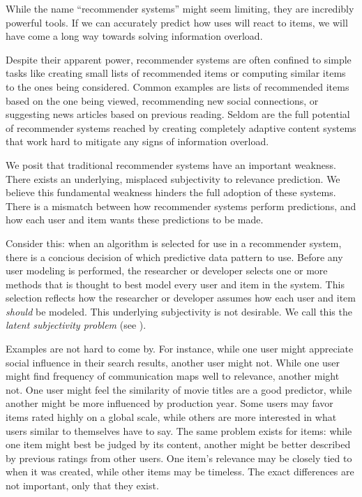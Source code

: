While the name ``recommender systems'' might seem limiting, they are incredibly powerful tools.
If we can accurately predict how uses will react to items,
we will have come a long way towards solving information overload.

Despite their apparent power, recommender systems are often confined
to simple tasks like creating small lists of recommended items
or computing similar items to the ones being considered.
Common examples are lists of recommended items based on the one being viewed, 
recommending new social connections, or suggesting news articles based on previous reading.
Seldom are the full potential of recommender systems reached by creating completely adaptive
content systems that work hard to mitigate any signs of information overload.

We posit that traditional recommender systems have an important weakness.
There exists an underlying, misplaced subjectivity to relevance prediction.
We believe this fundamental weakness hinders the full adoption of these systems.
There is a mismatch between how recommender systems perform predictions,
and how each user and item wants these predictions to be made.

Consider this: 
when an algorithm is selected for use in a recommender system,
there is a concious decision of which predictive data pattern to use.
Before any user modeling is performed, the researcher or developer selects
one or more methods that is thought to best model every user and item in the system.
This selection reflects how the researcher or developer assumes
how each user and item \emph{should} be modeled.
This underlying subjectivity is not desirable.
We call this the \emph{latent subjectivity problem}
(see \cite[p.33]{Bjorkoy2011}).

Examples are not hard to come by.
For instance, while one user might appreciate social
influence in their search results, another user might not.
While one user might find frequency of communication maps well to relevance,
another might not. 
One user might feel the similarity of movie titles are a good predictor,
while another might be more influenced by production year.
Some users may favor items rated highly on a global scale,
while others are more interested in what users similar to themselves have to say.
The same problem exists for items: while one item might best be judged by its content,
another might be better described by previous ratings from other users.
One item's relevance may be closely tied to when it was created,
while other items may be timeless.
The exact differences are not important, only that they exist.

